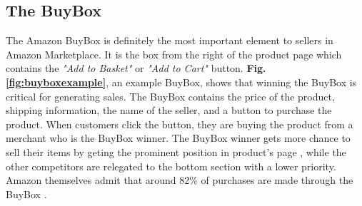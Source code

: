 {%
%
%
%
%


\subsection{The BuyBox}
\label{sec:buybox}
The Amazon BuyBox is definitely the most important element to sellers in Amazon Marketplace. It is the box from the right of the product page which contains the \textit{"Add to Basket"} or \textit{"Add to Cart"} button. \textbf{Fig.\ref{fig:buyboxexample}}, an example BuyBox, shows that winning the BuyBox is critical for generating sales. The BuyBox contains the price of the product, shipping information, the name of the seller, and a button to purchase the product. When customers click the button, they are buying the product from a merchant who is the BuyBox winner. The BuyBox winner gets more chance to sell their items by geting the prominent position in product's page , while the other competitors are relegated to the bottom section with a lower priority. Amazon themselves admit that around 82\% of purchases are made through the BuyBox \cite{taftamazon}. 

}
